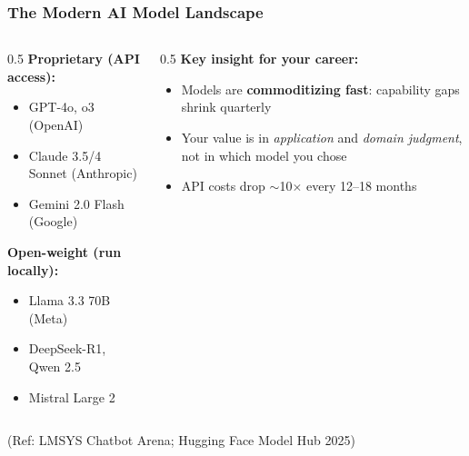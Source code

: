 \begin{frame}[fragile]\frametitle{The Modern AI Model Landscape}
\begin{columns}
    \begin{column}[T]{0.5\linewidth}
\textbf{Proprietary (API access):}
\begin{itemize}
\item GPT-4o, o3 (OpenAI)
\item Claude 3.5/4 Sonnet (Anthropic)
\item Gemini 2.0 Flash (Google)
\end{itemize}
\textbf{Open-weight (run locally):}
\begin{itemize}
\item Llama 3.3 70B (Meta)
\item DeepSeek-R1, Qwen 2.5
\item Mistral Large 2
\end{itemize}
    \end{column}
    \begin{column}[T]{0.5\linewidth}
\textbf{Key insight for your career:}
\begin{itemize}
\item Models are \textbf{commoditizing fast}: capability gaps shrink quarterly
\item Your value is in \textit{application} and \textit{domain judgment}, not in which model you chose
\item API costs drop $\sim$10$\times$ every 12--18 months
\end{itemize}
    \end{column}
\end{columns}
{\tiny (Ref: LMSYS Chatbot Arena; Hugging Face Model Hub 2025)}
\end{frame}

